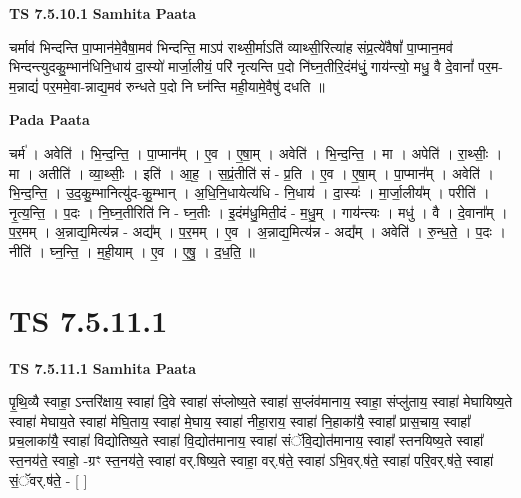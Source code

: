 \documentclass[17pt]{extarticle}
\begin{document}
\textbf{TS 7.5.10.1 } \newline
\textbf{Samhita Paata} \newline

चर्माव॑ भिन्दन्ति पा॒प्मान॑मे॒वैषा॒मव॑ भिन्दन्ति॒ माऽप॑ राथ्सी॒र्माऽति॑ व्याथ्सी॒रित्या॑ह संप्र॒त्ये॑वैषां᳚ पा॒प्मान॒मव॑ भिन्दन्त्युदकु॒म्भान॑धिनि॒धाय॑ दा॒स्यो॑ मार्जा॒लीयं॒ परि॑ नृत्यन्ति प॒दो नि॑घ्न॒तीरि॒दंम॑धुं॒ गाय॑न्त्यो॒ मधु॒ वै दे॒वानां᳚ पर॒म-म॒न्नाद्यं॑ पर॒ममे॒वा-न्नाद्य॒मव॑ रुन्धते प॒दो नि घ्न॑न्ति मही॒यामे॒वैषु॑ दधति ॥ \newline

\textbf{Pada Paata} \newline

चर्म॑ । अवेति॑ । भि॒न्द॒न्ति॒ । पा॒प्मान᳚म् । ए॒व । ए॒षा॒म् । अवेति॑ । भि॒न्द॒न्ति॒ । मा । अपेति॑ । रा॒थ्सीः॒ । मा । अतीति॑ । व्या॒थ्सीः॒ । इति॑ । आ॒ह॒ । स॒प्रं॒तीति॑ सं - प्र॒ति । ए॒व । ए॒षा॒म् । पा॒प्मान᳚म् । अवेति॑ । भि॒न्द॒न्ति॒ । उ॒द॒कु॒म्भानित्यु॑द-कु॒म्भान् । अ॒धि॒नि॒धायेत्य॑धि - नि॒धाय॑ । दा॒स्यः॑ । मा॒र्जा॒लीय᳚म् । परीति॑ । नृ॒त्य॒न्ति॒ । प॒दः । नि॒घ्न॒तीरिति॑ नि - घ्न॒तीः । इ॒दंम॑धु॒मिती॒दं - म॒धु॒म् । गाय॑न्त्यः । मधु॑ । वै । दे॒वाना᳚म् । प॒र॒मम् । अ॒न्नाद्य॒मित्य॑न्न - अद्य᳚म् । प॒र॒मम् । ए॒व । अ॒न्नाद्य॒मित्य॑न्न - अद्य᳚म् । अवेति॑ । रु॒न्ध॒ते॒ । प॒दः । नीति॑ । घ्न॒न्ति॒ । म॒ही॒याम् । ए॒व । ए॒षु॒ । द॒ध॒ति॒ ॥  \newline




\section*{ TS 7.5.11.1 }

\textbf{TS 7.5.11.1 } \newline
\textbf{Samhita Paata} \newline

पृ॒थि॒व्यै स्वाहा॒ ऽन्तरि॑क्षाय॒ स्वाहा॑ दि॒वे स्वाहा॑ संप्लोष्य॒ते स्वाहा॑ स॒प्लंव॑मानाय॒ स्वाहा॒ संप्लु॑ताय॒ स्वाहा॑ मेघायिष्य॒ते स्वाहा॑ मेघाय॒ते स्वाहा॑ मेघि॒ताय॒ स्वाहा॑ मे॒घाय॒ स्वाहा॑ नीहा॒राय॒ स्वाहा॑ नि॒हाका॑यै॒ स्वाहा᳚ प्रास॒चाय॒ स्वाहा᳚ प्रच॒लाका॑यै॒ स्वाहा॑ विद्योतिष्य॒ते स्वाहा॑ वि॒द्योत॑मानाय॒ स्वाहा॑ संॅवि॒द्योत॑मानाय॒ स्वाहा᳚ स्तनयिष्य॒ते स्वाहा᳚ स्त॒नय॑ते॒ स्वाहो॒ -ग्रꣳ स्त॒नय॑ते॒ स्वाहा॑ वर्.षिष्य॒ते स्वाहा॒ वर्.ष॑ते॒ स्वाहा॑ ऽभि॒वर्.ष॑ते॒ स्वाहा॑ परि॒वर्.ष॑ते॒ स्वाहा॑ सं॒ॅवर्.ष॑ते॒ - [  ] \newline
\end{document}
